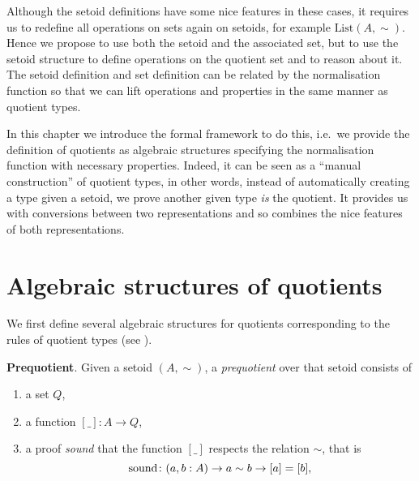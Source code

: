 Although the setoid definitions have some nice features in these cases, it requires us to redefine all operations on sets again on setoids, for example $\text{List} (A,\sim)$.
Hence we propose to use both the setoid
and the associated set, but to use the setoid structure to define
operations on the quotient set and to reason about it. 
The setoid definition and set definition can be related by the normalisation function so that we can lift operations and properties in the same manner as quotient types.



In this chapter we introduce the formal framework to do this, i.e.\ we provide the definition of quotients as algebraic structures specifying the normalisation function with necessary properties. Indeed, it can be seen as a ``manual construction'' of quotient types, in other words,
instead of automatically creating a type given a setoid, we
prove another given type \emph{is} the quotient.
It provides us with conversions between two representations and so combines the nice features of both representations. 



\section{Algebraic structures of quotients}

We first define several algebraic structures for quotients corresponding to the rules of quotient types (see ).

\begin{definition}
\textbf{Prequotient}.
\noindent
Given a setoid $(A,\sim)$,  a \emph{prequotient} over that setoid consists of
\begin{enumerate}
\item \label{enum:Q} a set $Q$,
\item \label{enum:box}a function $[\_]: A \rightarrow Q$,
\item \label{enum:sound} a proof \emph{sound} that the function $[\_]$ respects the relation $\sim$,
that is \[\operatorname{sound}\colon (a,b : A) \rightarrow a\sim b \rightarrow [a] = [b],\]
\end{enumerate}
\end{definition}

